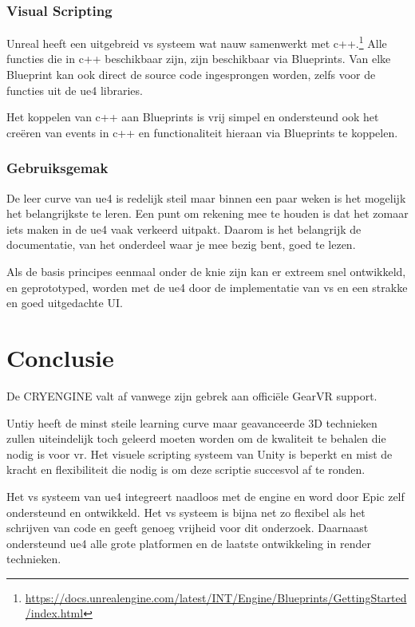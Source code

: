 \subsubsection{Visual Scripting}
Unreal heeft een uitgebreid \gls{vs} systeem wat nauw samenwerkt met c++.\footnote{\url{https://docs.unrealengine.com/latest/INT/Engine/Blueprints/GettingStarted/index.html}} Alle functies die in c++ beschikbaar zijn, zijn beschikbaar via Blueprints. Van elke Blueprint kan ook direct de source code ingesprongen worden, zelfs voor de functies uit de \gls{ue4} libraries.

Het koppelen van c++ aan Blueprints is vrij simpel en ondersteund ook het creëren van events in c++ en functionaliteit hieraan via Blueprints te koppelen.

\subsubsection{Gebruiksgemak}
De leer curve van \gls{ue4} is redelijk steil maar binnen een paar weken is het mogelijk het belangrijkste te leren. Een punt om rekening mee te houden is dat het zomaar iets maken in de \gls{ue4} vaak verkeerd uitpakt. Daarom is het belangrijk de documentatie, van het onderdeel waar je mee bezig bent, goed te lezen.

Als de basis principes eenmaal onder de knie zijn kan er extreem snel ontwikkeld, en geprototyped, worden met de \gls{ue4} door de implementatie van \gls{vs} en een strakke en goed uitgedachte UI.

\section{Conclusie}
De CRYENGINE valt af vanwege zijn gebrek aan officiële GearVR support. 

Untiy heeft de minst steile learning curve maar geavanceerde 3D technieken zullen uiteindelijk toch geleerd moeten worden om de kwaliteit te behalen die nodig is voor \gls{vr}. Het visuele scripting systeem van Unity is beperkt en mist de kracht en flexibiliteit die nodig is om deze scriptie succesvol af te ronden.

Het \gls{vs} systeem van \gls{ue4} integreert naadloos met de engine en word door Epic zelf ondersteund en ontwikkeld. Het \gls{vs} systeem is bijna net zo flexibel als het schrijven van code en geeft genoeg vrijheid voor dit onderzoek. Daarnaast ondersteund \gls{ue4} alle grote platformen en de laatste ontwikkeling in render technieken.